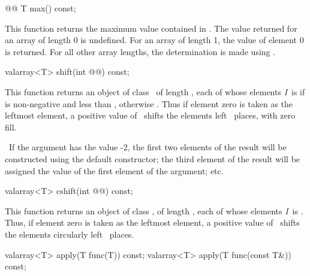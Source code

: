 \documentclass[american,twoside]{book}
\begin{document}
\begin{paras}
%
\begin{itemdecl}
@@ T max() const;
\end{itemdecl}

\begin{itemdescr}
\pnum
This function returns the maximum value contained in
.
The value returned for an array of length 0 is undefined.
For an array
of length 1, the value of element 0 is returned.
For all other array
lengths, the determination is made using
.
\end{itemdescr}

%
\begin{itemdecl}
valarray<T> shift(int @@) const;
\end{itemdecl}

\begin{itemdescr}
\pnum
This function returns an object of class
\
of length
,
each of whose elements
\textit{I}\ 
is
if
is non-negative and less than
,
otherwise
.
Thus if element zero is taken as the leftmost element,
a positive value of \ shifts the elements left \
places, with zero fill.

\pnum
\enterexample\ 
If the argument has the value -2,
the first two elements of the result will be constructed using the default
constructor; the third element of the result will be assigned the value
of the first element of the argument; etc.
\exitexample\ 
%
\begin{itemdecl}
valarray<T> cshift(int @\farg{n}@) const;
\end{itemdecl}

\pnum
This function returns an object of class
\tcode{valarray<T>},
of length
,
each of whose elements
\textit{I}\ 
is
.
Thus, if element zero is taken as the leftmost element,
a positive value of \ shifts the elements circularly
left \farg{n}\ places.
\end{itemdescr}

%
\begin{itemdecl}
valarray<T> apply(T func(T)) const;
valarray<T> apply(T func(const T&)) const;
\end{itemdecl}


\end{paras}
\end{document}
